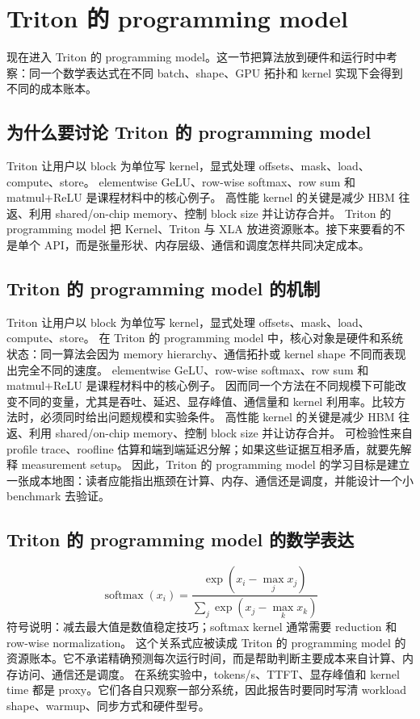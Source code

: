 \documentclass[a4paper]{article}
\begin{document}
\section{Triton 的 programming model}
现在进入 Triton 的 programming model。这一节把算法放到硬件和运行时中考察：同一个数学表达式在不同 batch、shape、GPU 拓扑和 kernel 实现下会得到不同的成本账本。
\subsection{为什么要讨论 Triton 的 programming model}
Triton 让用户以 block 为单位写 kernel，显式处理 offsets、mask、load、compute、store。
elementwise GeLU、row-wise softmax、row sum 和 matmul+ReLU 是课程材料中的核心例子。
高性能 kernel 的关键是减少 HBM 往返、利用 shared/on-chip memory、控制 block size 并让访存合并。
Triton 的 programming model 把 Kernel、Triton 与 XLA 放进资源账本。接下来要看的不是单个 API，而是张量形状、内存层级、通信和调度怎样共同决定成本。
\subsection{Triton 的 programming model 的机制}
Triton 让用户以 block 为单位写 kernel，显式处理 offsets、mask、load、compute、store。 在 Triton 的 programming model 中，核心对象是硬件和系统状态：同一算法会因为 memory hierarchy、通信拓扑或 kernel shape 不同而表现出完全不同的速度。
elementwise GeLU、row-wise softmax、row sum 和 matmul+ReLU 是课程材料中的核心例子。 因而同一个方法在不同规模下可能改变不同的变量，尤其是吞吐、延迟、显存峰值、通信量和 kernel 利用率。比较方法时，必须同时给出问题规模和实验条件。
高性能 kernel 的关键是减少 HBM 往返、利用 shared/on-chip memory、控制 block size 并让访存合并。 可检验性来自 profile trace、roofline 估算和端到端延迟分解；如果这些证据互相矛盾，就要先解释 measurement setup。
因此，Triton 的 programming model 的学习目标是建立一张成本地图：读者应能指出瓶颈在计算、内存、通信还是调度，并能设计一个小 benchmark 去验证。
\subsection{Triton 的 programming model 的数学表达}
\[\operatorname{softmax}(x_i)=\frac{\exp(x_i-\max_j x_j)}{\sum_j\exp(x_j-\max_k x_k)}\]
符号说明：减去最大值是数值稳定技巧；softmax kernel 通常需要 reduction 和 row-wise normalization。
这个关系式应被读成 Triton 的 programming model 的资源账本。它不承诺精确预测每次运行时间，而是帮助判断主要成本来自计算、内存访问、通信还是调度。
在系统实验中，tokens/s、TTFT、显存峰值和 kernel time 都是 proxy。它们各自只观察一部分系统，因此报告时要同时写清 workload shape、warmup、同步方式和硬件型号。
\end{document}
